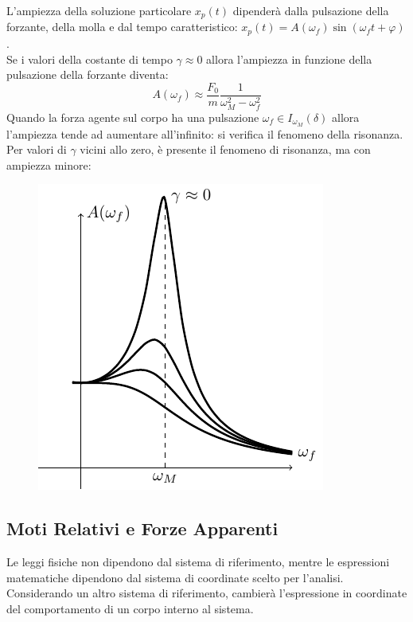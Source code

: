 \documentclass{article}
\numberwithin{equation}{subsection}
\begin{document}
L'ampiezza della soluzione particolare $x_p(t)$ dipenderà 
dalla pulsazione della forzante, della molla e dal tempo 
caratteristico: $x_p(t)=A(\omega_f)\sin(\omega_f t+\varphi)$. 
\\
Se i valori della costante di tempo $\gamma\approx0$ allora 
l'ampiezza in funzione della pulsazione della forzante diventa:
\begin{equation}
    A(\omega_f)\approx\displaystyle\frac{F_0}{m}\frac{1}{\omega_M^{2}-\omega_f^{2}}
\end{equation}
Quando la forza agente sul corpo ha una pulsazione 
$\omega_f\in I_{\omega_M}(\delta)$ allora l'ampiezza tende 
ad aumentare all'infinito: si verifica il fenomeno della 
risonanza. Per valori di $\gamma$ vicini allo zero, è presente 
il fenomeno di risonanza, ma con ampiezza minore:

\begin{figure}[H]%
    \centering
    \includegraphics{risonanza.pdf}%
\end{figure}

\subsection{Moti Relativi e Forze Apparenti}
Le leggi fisiche non dipendono dal sistema di riferimento, mentre le espressioni matematiche dipendono dal sistema di coordinate scelto per l'analisi. 
Considerando un altro sistema di riferimento, cambierà l'espressione in coordinate del comportamento di un corpo interno al sistema.
\end{document}

